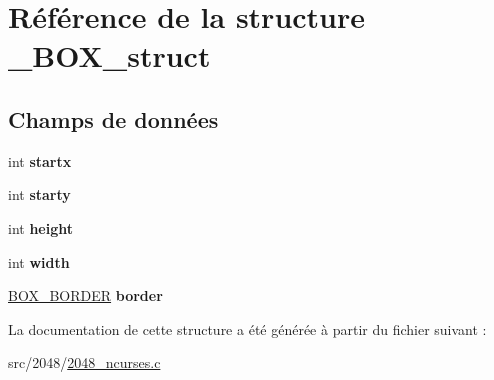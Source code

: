 \hypertarget{struct___b_o_x__struct}{
\section{Référence de la structure \_\-BOX\_\-struct}
\label{struct___b_o_x__struct}
}
\subsection*{Champs de données}
\begin{DoxyCompactItemize}
\item 
\hypertarget{struct___b_o_x__struct_a8f0744c55ee97ebf34757f8499a66139}{
int {\bfseries startx}}
\label{struct___b_o_x__struct_a8f0744c55ee97ebf34757f8499a66139}

\item 
\hypertarget{struct___b_o_x__struct_a19e264821cbd530471c1cf985d7cd239}{
int {\bfseries starty}}
\label{struct___b_o_x__struct_a19e264821cbd530471c1cf985d7cd239}

\item 
\hypertarget{struct___b_o_x__struct_ad12fc34ce789bce6c8a05d8a17138534}{
int {\bfseries height}}
\label{struct___b_o_x__struct_ad12fc34ce789bce6c8a05d8a17138534}

\item 
\hypertarget{struct___b_o_x__struct_a2474a5474cbff19523a51eb1de01cda4}{
int {\bfseries width}}
\label{struct___b_o_x__struct_a2474a5474cbff19523a51eb1de01cda4}

\item 
\hypertarget{struct___b_o_x__struct_ab3803ae87f2e1cf591032aad71a278a3}{
\hyperlink{struct__box__border__struct}{BOX\_\-BORDER} {\bfseries border}}
\label{struct___b_o_x__struct_ab3803ae87f2e1cf591032aad71a278a3}

\end{DoxyCompactItemize}


La documentation de cette structure a été générée à partir du fichier suivant :\begin{DoxyCompactItemize}
\item 
src/2048/\hyperlink{2048__ncurses_8c}{2048\_\-ncurses.c}\end{DoxyCompactItemize}
